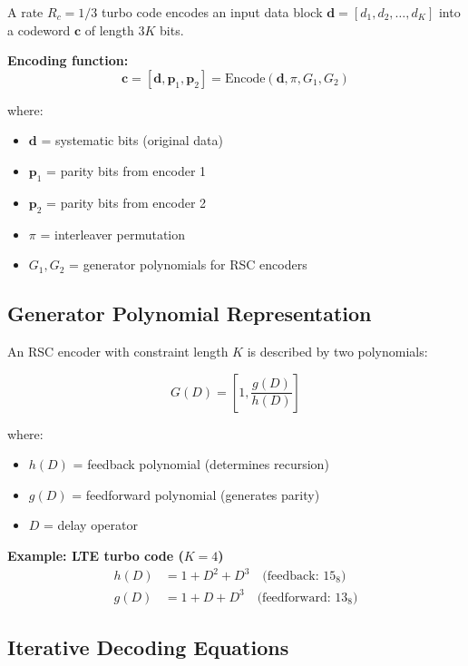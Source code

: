 A rate $R_c = 1/3$ turbo code encodes an input data block $\mathbf{d} = [d_1, d_2, \ldots, d_K]$ into a codeword $\mathbf{c}$ of length $3K$ bits.

\textbf{Encoding function:}
\begin{equation}
\mathbf{c} = [\mathbf{d}, \mathbf{p}_1, \mathbf{p}_2] = \text{Encode}(\mathbf{d}, \pi, G_1, G_2)
\end{equation}

where:
\begin{itemize}
\item $\mathbf{d}$ = systematic bits (original data)
\item $\mathbf{p}_1$ = parity bits from encoder 1
\item $\mathbf{p}_2$ = parity bits from encoder 2
\item $\pi$ = interleaver permutation
\item $G_1, G_2$ = generator polynomials for RSC encoders
\end{itemize}

\subsection{Generator Polynomial Representation}

An RSC encoder with constraint length $K$ is described by two polynomials:

\begin{equation}
G(D) = \left[1, \frac{g(D)}{h(D)}\right]
\end{equation}

where:
\begin{itemize}
\item $h(D)$ = feedback polynomial (determines recursion)
\item $g(D)$ = feedforward polynomial (generates parity)
\item $D$ = delay operator
\end{itemize}

\textbf{Example: LTE turbo code ($K=4$)}
\begin{equation}
\begin{aligned}
h(D) &= 1 + D^2 + D^3 \quad \text{(feedback: } 15_8\text{)} \\
g(D) &= 1 + D + D^3 \quad \text{(feedforward: } 13_8\text{)}
\end{aligned}
\end{equation}

\subsection{Iterative Decoding Equations}

